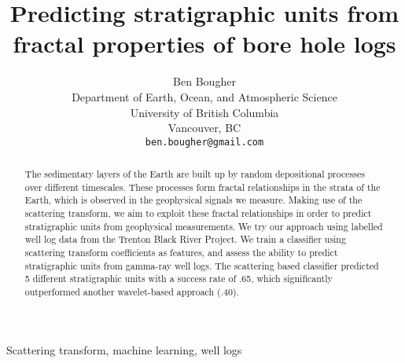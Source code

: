 \documentclass[journal]{IEEEtran}
\begin{document}
%
\title{Predicting stratigraphic units from fractal properties of
  bore hole logs}



\author{
Ben Bougher\\
Department of Earth, Ocean, and Atmospheric Science\\
University of British Columbia\\
Vancouver, BC\\
\texttt{ben.bougher@gmail.com} 
}



\maketitle

\begin{abstract}
The sedimentary layers of the Earth are built up by random depositional
processes over different timescales. These processes form fractal
relationships in the strata of the Earth, which is observed in the
geophysical signals we measure. Making use of the scattering
transform, we aim to exploit these fractal relationships  in
order to predict stratigraphic units from geophysical measurements. We
try our approach using labelled well log data from the Trenton Black
River Project. We train a classifier using scattering transform
coefficients as features, and assess the ability to predict
stratigraphic units from gamma-ray well logs. The scattering based
classifier predicted 5 different stratigraphic units with a success
rate of .65, which significantly outperformed another wavelet-based
approach (.40).
\end{abstract}

\begin{IEEEkeywords}
Scattering transform, machine learning, well logs
\end{IEEEkeywords}






%
\IEEEpeerreviewmaketitle
\end{document}
